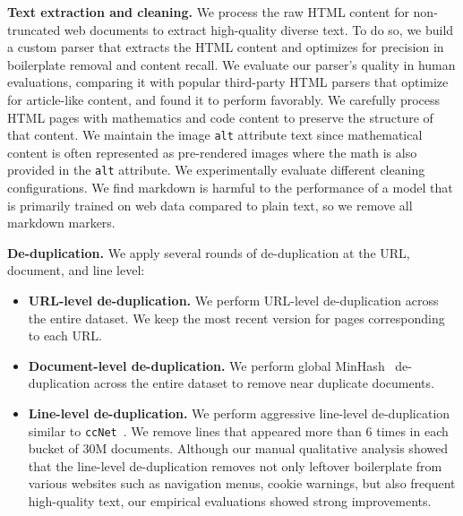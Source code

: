 \documentclass[dvipsnames]{fairmeta}
\begin{document}
\textbf{Text extraction and cleaning.}
We process the raw HTML content for non-truncated web documents to extract high-quality diverse text.
To do so, we build a custom parser that extracts the HTML content and optimizes for precision in boilerplate removal and content recall.
We evaluate our parser's quality in human evaluations, comparing it with popular third-party HTML parsers that optimize for article-like content, and found it to perform favorably.
We carefully process HTML pages with mathematics and code content to preserve the structure of that content. 
We maintain the image \texttt{alt} attribute text since mathematical content is often represented as pre-rendered images where the math is also provided in the \texttt{alt} attribute.
We experimentally evaluate different cleaning configurations. 
We find markdown is harmful to the performance of a model that is primarily trained on web data compared to plain text, so we remove all markdown markers.

\textbf{De-duplication.}
We apply several rounds of de-duplication at the URL, document, and line level:

\begin{itemize}
\item \textbf{URL-level de-duplication.}
We perform URL-level de-duplication across the entire dataset. We keep the most recent version for pages corresponding to each URL.

\item \textbf{Document-level de-duplication.}
We perform global MinHash~\citep{666900} de-duplication across the entire dataset to remove near duplicate documents.

\item \textbf{Line-level de-duplication.}
We perform aggressive line-level de-duplication similar to \texttt{ccNet}~\citep{wenzek2019ccnetextractinghighquality}.
We remove lines that appeared more than 6 times in each bucket of 30M documents. 
Although our manual qualitative analysis showed that the line-level de-duplication removes not only leftover boilerplate from various websites such as navigation menus, cookie warnings, but also frequent high-quality text, our empirical evaluations showed strong improvements.

\end{itemize}
\end{document}
